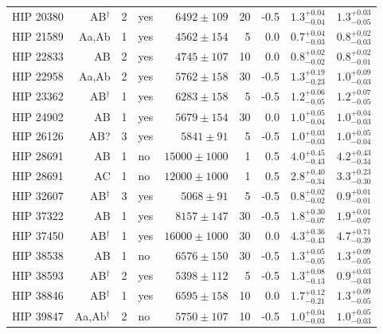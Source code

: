 \begin{scriptsize}
\begin{longtable}{|l|rrlrrrll|}
  HIP 20380 & AB$^{\dagger}$ &     2 & yes &  $6492 \pm 109$ &      20 &    -0.5  &  $1.3^{+0.04}_{-0.04}$ &  $1.3^{+0.03}_{-0.05}$ \\
  HIP 21589 & Aa,Ab &     1 & yes &  $4562 \pm 154$ &       5 &     0.0  &  $0.7^{+0.04}_{-0.03}$ &  $0.8^{+0.02}_{-0.03}$ \\
  HIP 22833 & AB &     2 & yes &  $4745 \pm 107$ &      10 &     0.0  &  $0.8^{+0.02}_{-0.02}$ &  $0.8^{+0.02}_{-0.01}$ \\
  HIP 22958 & Aa,Ab &     2 & yes &  $5762 \pm 158$ &      30 &    -0.5  &  $1.3^{+0.19}_{-0.23}$ &  $1.0^{+0.09}_{-0.03}$ \\
  HIP 23362 & AB$^{\dagger}$ &     1 & yes &  $6283 \pm 158$ &       5 &    -0.5  &  $1.2^{+0.06}_{-0.05}$ &  $1.2^{+0.07}_{-0.05}$ \\
  HIP 24902 & AB &     1 & yes &  $5679 \pm 154$ &      30 &     0.0  &  $1.0^{+0.05}_{-0.04}$ &  $1.0^{+0.04}_{-0.03}$ \\
  HIP 26126 & AB? &     3 & yes &   $5841 \pm 91$ &       5 &    -0.5  &  $1.0^{+0.03}_{-0.03}$ &  $1.0^{+0.05}_{-0.04}$ \\
  HIP 28691 & AB &     1 & no &  $15000 \pm 1000$ &      1 &     0.5 &  $4.0^{+0.45}_{-0.43}$ &  $4.2^{+0.43}_{-0.34}$ \\
  HIP 28691 & AC &     1 & no &  $12000 \pm 1000$ &      1 &     0.5 &  $2.8^{+0.40}_{-0.34}$ &  $3.3^{+0.23}_{-0.30}$ \\
  HIP 32607 & AB$^{\dagger}$ &     3 & yes &   $5068 \pm 91$ &       5 &    -0.5  &  $0.8^{+0.02}_{-0.02}$ &  $0.9^{+0.01}_{-0.01}$ \\
  HIP 37322 & AB &     1 & yes &    $8157 \pm 147$ &     30 &    -0.5 &  $1.8^{+0.30}_{-0.07}$ &  $1.9^{+0.01}_{-0.07}$ \\
  HIP 37450 & AB$^{\dagger}$ &     1 & yes &  $16000 \pm 1000$ &     30 &     0.0 &  $4.3^{+0.36}_{-0.43}$ &  $4.7^{+0.71}_{-0.39}$ \\
  HIP 38538 & AB      &     1 & no &   $6576 \pm 150$ &      30 &    -0.5  &  $1.3^{+0.05}_{-0.05}$ &  $1.3^{+0.09}_{-0.05}$ \\
  HIP 38593 & AB$^{\dagger}$ &     2 & yes &  $5398 \pm 112$ &       5 &    -0.5  &  $1.3^{+0.08}_{-0.13}$ &  $0.9^{+0.03}_{-0.03}$ \\
  HIP 38846 & AB$^{\dagger}$ &     1 & yes &  $6595 \pm 158$ &      10 &     0.0  &  $1.7^{+0.12}_{-0.21}$ &  $1.3^{+0.09}_{-0.05}$ \\
  HIP 39847 & Aa,Ab$^{\dagger}$ &     2 & no &  $5750 \pm 107$ &      10 &    -0.5  &  $1.0^{+0.04}_{-0.03}$ &  $1.0^{+0.05}_{-0.03}$ \\

\end{longtable}
\end{scriptsize}
